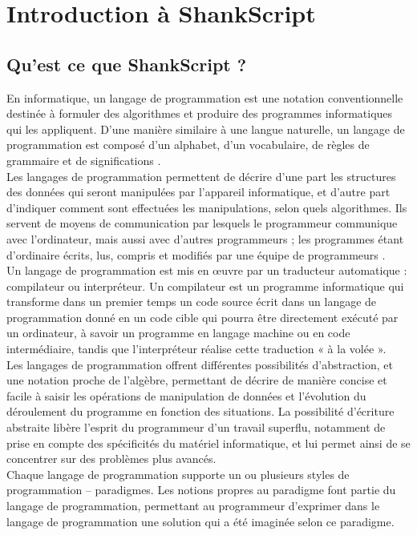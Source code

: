 \chapter{Introduction à ShankScript}


\section{Qu'est ce que ShankScript ?}


En informatique, un langage de programmation est une notation conventionnelle destinée à formuler des algorithmes et produire des programmes informatiques qui les appliquent. D'une manière similaire à une langue naturelle, un langage de programmation est composé d'un alphabet, d'un vocabulaire, de règles de grammaire et de significations .
\\[0.5cm]
Les langages de programmation permettent de décrire d'une part les structures des données qui seront manipulées par l'appareil informatique, et d'autre part d'indiquer comment sont effectuées les manipulations, selon quels algorithmes. Ils servent de moyens de communication par lesquels le programmeur communique avec l'ordinateur, mais aussi avec d'autres programmeurs ; les programmes étant d'ordinaire écrits, lus, compris et modifiés par une équipe de programmeurs .
\\
Un langage de programmation est mis en œuvre par un traducteur automatique : compilateur ou interpréteur. Un compilateur est un programme informatique qui transforme dans un premier temps un code source écrit dans un langage de programmation donné en un code cible qui pourra être directement exécuté par un ordinateur, à savoir un programme en langage machine ou en code intermédiaire, tandis que l'interpréteur réalise cette traduction « à la volée ».
\\[0.5cm]
Les langages de programmation offrent différentes possibilités d'abstraction, et une notation proche de l'algèbre, permettant de décrire de manière concise et facile à saisir les opérations de manipulation de données et l'évolution du déroulement du programme en fonction des situations. La possibilité d'écriture abstraite libère l'esprit du programmeur d'un travail superflu, notamment de prise en compte des spécificités du matériel informatique, et lui permet ainsi de se concentrer sur des problèmes plus avancés.
\\[0.5cm]
Chaque langage de programmation supporte un ou plusieurs styles de programmation – paradigmes. Les notions propres au paradigme font partie du langage de programmation, permettant au programmeur d'exprimer dans le langage de programmation une solution qui a été imaginée selon ce paradigme.
